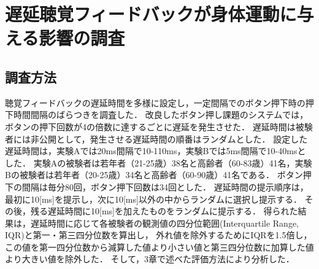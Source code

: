\section{遅延聴覚フィードバックが身体運動に与える影響の調査}
\subsection{調査方法}
聴覚フィードバックの遅延時間を多様に設定し，一定間隔でのボタン押下時の押下時間間隔のばらつきを調査した．
改良したボタン押し課題のシステムでは，ボタンの押下回数が4の倍数に達するごとに遅延を発生させた．
遅延時間は被験者には非公開として，発生させる遅延時間の順番はランダムとした．
設定した遅延時間は，実験Aでは20ms間隔で10-110ms，実験Bでは5ms間隔で10-40msとした．
実験Aの被験者は若年者（21-25歳）38名と高齢者（60-83歳）41名，実験Bの被験者は若年者（20-25歳）34名と高齢者（60-90歳）41名である．
ボタン押下の間隔は毎分80回，ボタン押下回数は34回とした．
遅延時間の提示順序は，最初に10[ms]を提示し，次に10[ms]以外の中からランダムに選択し提示する．
その後，残る遅延時間に10[ms]を加えたものをランダムに提示する．
得られた結果は，遅延時間に応じて各被験者の観測値の四分位範囲(Interquartile Range, IQR)と第一・第三四分位数を算出し，
外れ値を除外するためにIQRを1.5倍し，この値を第一四分位数から減算した値より小さい値と第三四分位数に加算した値より大きい値を除外した．
そして，3章で述べた評価方法により分析した．
